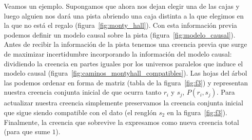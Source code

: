 \documentclass[a4paper,11pt]{book}
\theoremstyle{definition}
\begin{document}
Veamos un ejemplo.
%
Supongamos que ahora nos dejan elegir una de las cajas y luego alguien nos dará una pista abriendo una caja distinta a la que elegimos en la que no está el regalo (figura~\ref{fig:monty_hall}).
%
Con esta información previa podemos definir un modelo causal sobre la pista (figura~\ref{fig:modelo_causal}).
%
Antes de recibir la información de la pista tenemos una creencia previa que surge de maximizar incertidumbre incorporando la información del modelo causal: dividiendo la creencia en partes iguales por los universos paralelos que induce el modelo causal (figura~\ref{fig:caminos_montyhall_compatibles}).
%
Las hojas del árbol las podemos ordenar en forma de matriz (tabla de la figura~\ref{fig:f3}) y representan nuestra creencia conjunta inicial de que ocurra tanto $r_i$ y $s_j$, $P(r_i,s_j)$.
%
Para actualizar nuestra creencia simplemente preservamos la creencia conjunta inicial que sigue siendo compatible con el dato (el renglón $s_2$ en la figura~\ref{fig:f3}).
%
Finalmente, la creencia que sobrevive la expresamos como nueva creencia total (para que sume $1$).
%
\end{document}
